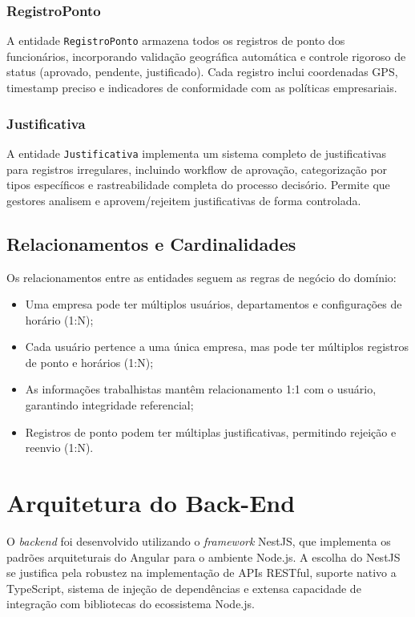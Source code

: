 \subsubsection{RegistroPonto}

A entidade \texttt{RegistroPonto} armazena todos os registros de ponto dos funcionários, incorporando validação geográfica automática e controle rigoroso de status (aprovado, pendente, justificado). Cada registro inclui coordenadas GPS, timestamp preciso e indicadores de conformidade com as políticas empresariais.

\subsubsection{Justificativa}

A entidade \texttt{Justificativa} implementa um sistema completo de justificativas para registros irregulares, incluindo workflow de aprovação, categorização por tipos específicos e rastreabilidade completa do processo decisório. Permite que gestores analisem e aprovem/rejeitem justificativas de forma controlada.

\subsection{Relacionamentos e Cardinalidades}

Os relacionamentos entre as entidades seguem as regras de negócio do domínio:

\begin{itemize}
    \item Uma empresa pode ter múltiplos usuários, departamentos e configurações de horário (1:N);
    \item Cada usuário pertence a uma única empresa, mas pode ter múltiplos registros de ponto e horários (1:N);
    \item As informações trabalhistas mantêm relacionamento 1:1 com o usuário, garantindo integridade referencial;
    \item Registros de ponto podem ter múltiplas justificativas, permitindo rejeição e reenvio (1:N).
\end{itemize}

\section{Arquitetura do Back-End}

O \textit{backend} foi desenvolvido utilizando o \textit{framework} NestJS, que implementa os padrões arquiteturais do Angular para o ambiente Node.js. A escolha do NestJS se justifica pela robustez na implementação de APIs RESTful, suporte nativo a TypeScript, sistema de injeção de dependências e extensa capacidade de integração com bibliotecas do ecossistema Node.js.


